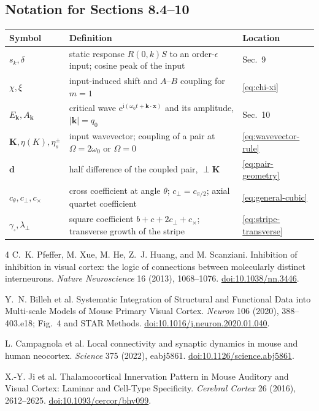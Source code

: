 \documentclass[11pt]{article}
\newcommand{\ii}{\mathrm{i}}
\newcommand{\ee}{\mathrm{e}}
\begin{document}
\subsection{Notation for Sections 8.4--10}
\begingroup\small
\noindent\begin{tabular}{@{}p{}p{}p{}@{}}
\toprule
Symbol & Definition & Location\\
\midrule
$s_k,\delta$ & static response $R(0,k)S$ to an order-$\epsilon$ input; cosine peak of the input & Sec.~9\\
$\chi,\xi$ & input-induced shift and $A$--$B$ coupling for $m=1$ & \eqref{eq:chi-xi}\\
$E_{\boldsymbol k},A_{\boldsymbol k}$ & critical wave $\ee^{\ii(\omega_0t+\boldsymbol k\cdot\boldsymbol x)}$ and its amplitude, $|\boldsymbol k|=q_0$ & Sec.~10\\
$\boldsymbol K,\eta(K),\eta_s^\pm$ & input wavevector; coupling of a pair at $\Omega=2\omega_0$ or $\Omega=0$ & \eqref{eq:wavevector-rule}\\
$\boldsymbol d$ & half difference of the coupled pair, $\perp\boldsymbol K$ & \eqref{eq:pair-geometry}\\
$c_\theta,c_\perp,c_\times$ & cross coefficient at angle $\theta$; $c_\perp=c_{\pi/2}$; axial quartet coefficient & \eqref{eq:general-cubic}\\
$\gamma_\square,\lambda_\perp$ & square coefficient $b+c+2c_\perp+c_\times$; transverse growth of the stripe & \eqref{eq:stripe-transverse}\\
\bottomrule
\end{tabular}
\endgroup

\clearpage
\begin{thebibliography}{4}
C.~K. Pfeffer, M. Xue, M. He, Z.~J. Huang, and M. Scanziani.
Inhibition of inhibition in visual cortex: the logic of connections between
molecularly distinct interneurons.
\emph{Nature Neuroscience} 16 (2013), 1068--1076.
\href{https://doi.org/10.1038/nn.3446}{doi:10.1038/nn.3446}.

Y.~N. Billeh et al.
Systematic Integration of Structural and Functional Data into Multi-scale
Models of Mouse Primary Visual Cortex.
\emph{Neuron} 106 (2020), 388--403.e18; Fig.~4 and STAR Methods.
\href{https://doi.org/10.1016/j.neuron.2020.01.040}{doi:10.1016/j.neuron.2020.01.040}.

L. Campagnola et al.
Local connectivity and synaptic dynamics in mouse and human neocortex.
\emph{Science} 375 (2022), eabj5861.
\href{https://doi.org/10.1126/science.abj5861}{doi:10.1126/science.abj5861}.

X.-Y. Ji et al.
Thalamocortical Innervation Pattern in Mouse Auditory and Visual Cortex:
Laminar and Cell-Type Specificity.
\emph{Cerebral Cortex} 26 (2016), 2612--2625.
\href{https://doi.org/10.1093/cercor/bhv099}{doi:10.1093/cercor/bhv099}.
\end{thebibliography}
\end{document}
